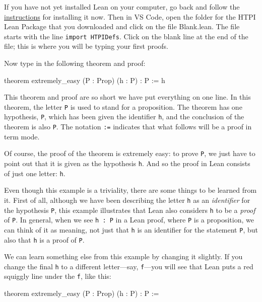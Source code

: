 \documentclass[
  letterpaper,
  DIV=11,
  numbers=noendperiod]{scrreprt}
\makeatletter
\newenvironment{Shaded}{\begin{snugshade}}{\end{snugshade}}
\newcommand{\ErrorTok}[1]{\textcolor[rgb]{0.68,0.00,0.00}{#1}}
\newcommand{\KeywordTok}[1]{\textcolor[rgb]{0.00,0.23,0.31}{#1}}
\newcommand{\NormalTok}[1]{\textcolor[rgb]{0.00,0.23,0.31}{#1}}
\newcommand{\SpecialCharTok}[1]{\textcolor[rgb]{0.37,0.37,0.37}{#1}}
\def\squiggly{\bgroup \markoverwith{\textcolor{red}{\lower3.5\p@\hbox{\sixly \char58}}}\ULon}
\renewcommand{\NormalTok}[1]{\textcolor[HTML]{000000}{#1}}
\renewcommand{\KeywordTok}[1]{\textcolor[HTML]{0000FF}{#1}}
\renewcommand{\SpecialCharTok}[1]{}
\renewcommand{\ErrorTok}[1]{\squiggly{#1}}
\theoremstyle{remark}
\makeatother
\begin{document}
If you have not yet installed Lean on your computer, go back and follow
the \protect\hyperlink{installing-lean}{instructions} for installing it
now. Then in VS Code, open the folder for the HTPI Lean Package that you
downloaded and click on the file Blank.lean. The file starts with the
line \texttt{import\ HTPIDefs}. Click on the blank line at the end of
the file; this is where you will be typing your first proofs.

Now type in the following theorem and proof:

\begin{Shaded}
\begin{Highlighting}[]
\KeywordTok{theorem}\NormalTok{ extremely\_easy (P : }\KeywordTok{Prop}\NormalTok{) (h : P) : P := h}
\end{Highlighting}
\end{Shaded}

This theorem and proof are so short we have put everything on one line.
In this theorem, the letter \texttt{P} is used to stand for a
proposition. The theorem has one hypothesis, \texttt{P}, which has been
given the identifier \texttt{h}, and the conclusion of the theorem is
also \texttt{P}. The notation \texttt{:=} indicates that what follows
will be a proof in term mode.

Of course, the proof of the theorem is extremely easy: to prove
\texttt{P}, we just have to point out that it is given as the hypothesis
\texttt{h}. And so the proof in Lean consists of just one letter:
\texttt{h}.

Even though this example is a triviality, there are some things to be
learned from it. First of all, although we have been describing the
letter \texttt{h} as an \emph{identifier} for the hypothesis \texttt{P},
this example illustrates that Lean also considers \texttt{h} to be a
\emph{proof} of \texttt{P}. In general, when we see \texttt{h\ :\ P} in
a Lean proof, where \texttt{P} is a proposition, we can think of it as
meaning, not just that \texttt{h} is an identifier for the statement
\texttt{P}, but also that \texttt{h} is a proof of \texttt{P}.

We can learn something else from this example by changing it slightly.
If you change the final \texttt{h} to a different letter---say,
\texttt{f}---you will see that Lean puts a red squiggly line under the
\texttt{f}, like this:

\begin{Shaded}
\begin{Highlighting}[]
\KeywordTok{theorem}\NormalTok{ extremely\_easy (P : }\KeywordTok{Prop}\NormalTok{) (h : P) : P := }\SpecialCharTok{!!}\ErrorTok{f}\SpecialCharTok{!!}
\end{Highlighting}
\end{Shaded}
\end{document}
